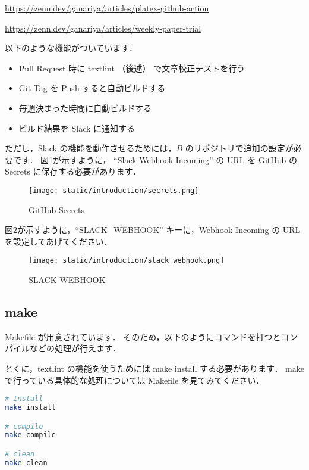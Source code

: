 \url{https://zenn.dev/ganariya/articles/platex-github-action}

\url{https://zenn.dev/ganariya/articles/weekly-paper-trial}

以下のような機能がついています．

\begin{itemize}
    \item Pull Request 時に textlint （後述） で文章校正テストを行う
    \item Git Tag を Push すると自動ビルドする
    \item 毎週決まった時間に自動ビルドする
    \item ビルド結果を Slack に通知する
\end{itemize}

ただし，Slack の機能を動作させるためには，$B$ のリポジトリで追加の設定が必要です．
図\ref{fig:introduction_secrets}が示すように， ``Slack Webhook Incoming'' の URL を GitHub の Secrets に保存する必要があります．

\begin{figure}[H]
    \centering
    \texttt{[image: static/introduction/secrets.png]}
    \caption{GitHub Secrets}
    \label{fig:introduction_secrets}
\end{figure}

図\ref{fig:introduction_slack_webhook}が示すように，``SLACK\_WEBHOOK'' キーに，Webhook Incoming の URL を設定してあげてください．

\begin{figure}[H]
    \centering
    \texttt{[image: static/introduction/slack\_webhook.png]}
    \caption{SLACK WEBHOOK}
    \label{fig:introduction_slack_webhook}
\end{figure}

\subsection{make}

Makefile が用意されています．
そのため，以下のようにコマンドを打つとコンパイルなどの処理が行えます．

とくに，textlint の機能を使うためには make install する必要があります．
make で行っている具体的な処理については Makefile を見てみてください．

\begin{lstlisting}[language=bash,caption={Makefile}]
# Install
make install

# compile
make compile

# clean
make clean
\end{lstlisting}

